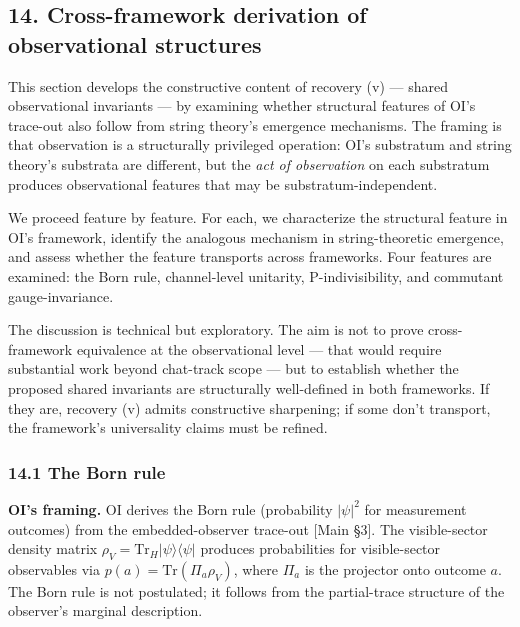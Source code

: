\documentclass[
]{article}
\begin{document}
\hypertarget{cross-framework-derivation-of-observational-structures}{%
\subsection{14. Cross-framework derivation of observational
structures}\label{cross-framework-derivation-of-observational-structures}}

This section develops the constructive content of recovery (v) ---
shared observational invariants --- by examining whether structural
features of OI's trace-out also follow from string theory's emergence
mechanisms. The framing is that observation is a structurally privileged
operation: OI's substratum and string theory's substrata are different,
but the \emph{act of observation} on each substratum produces
observational features that may be substratum-independent.

We proceed feature by feature. For each, we characterize the structural
feature in OI's framework, identify the analogous mechanism in
string-theoretic emergence, and assess whether the feature transports
across frameworks. Four features are examined: the Born rule,
channel-level unitarity, P-indivisibility, and commutant
gauge-invariance.

The discussion is technical but exploratory. The aim is not to prove
cross-framework equivalence at the observational level --- that would
require substantial work beyond chat-track scope --- but to establish
whether the proposed shared invariants are structurally well-defined in
both frameworks. If they are, recovery (v) admits constructive
sharpening; if some don't transport, the framework's universality claims
must be refined.

\hypertarget{the-born-rule}{%
\subsubsection{14.1 The Born rule}\label{the-born-rule}}

\textbf{OI's framing.} OI derives the Born rule (probability
\(|\psi|^2\) for measurement outcomes) from the embedded-observer
trace-out {[}Main §3{]}. The visible-sector density matrix
\(\rho_V = \text{Tr}_H |\psi\rangle\langle\psi|\) produces probabilities
for visible-sector observables via \(p(a) = \text{Tr}(\Pi_a \rho_V)\),
where \(\Pi_a\) is the projector onto outcome \(a\). The Born rule is
not postulated; it follows from the partial-trace structure of the
observer's marginal description.
\end{document}
